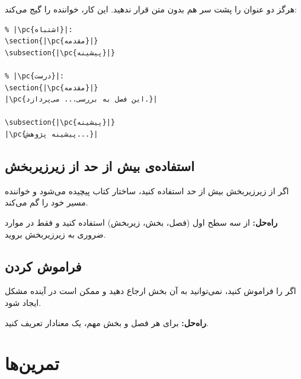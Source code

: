 هرگز دو عنوان را پشت سر هم بدون متن قرار
ندهید. این کار، خواننده را گیج می‌کند:

\begin{latin}
\begin{verbatim}
% |\pc{اشتباه}|:
\section{|\pc{مقدمه}|}
\subsection{|\pc{پیشینه}|}

% |\pc{درست}|:
\section{|\pc{مقدمه}|}
|\pc{این فصل به بررسی... می‌پردازد.}|

\subsection{|\pc{پیشینه}|}
|\pc{پیشینه پژوهش...}|
\end{verbatim}
\end{latin}

\subsection{استفاده‌ی بیش از حد از زیرزیربخش}
\label{sec:chapters-mistake-deep}

اگر از زیرزیربخش بیش از حد استفاده کنید،
ساختار کتاب پیچیده می‌شود و خواننده مسیر
خود را گم می‌کند.

\textbf{راه‌حل:} از سه سطح اول (فصل، بخش،
زیربخش) استفاده کنید و فقط در موارد ضروری
به زیرزیربخش بروید.

\subsection{فراموش کردن }
\label{sec:chapters-mistake-label}

اگر  را فراموش کنید، نمی‌توانید
به آن بخش ارجاع دهید و ممکن است در آینده
مشکل ایجاد شود.

\textbf{راه‌حل:} برای هر فصل و بخش مهم، یک
 معنادار تعریف کنید.

\section{تمرین‌ها}
\label{sec:chapters-exercises}

